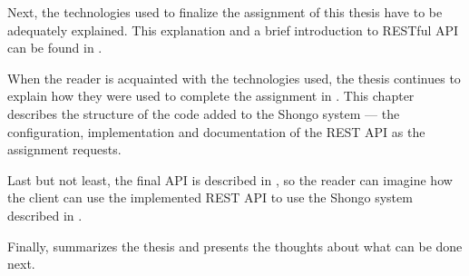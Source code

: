 Next, the technologies used to finalize the assignment of this thesis have to be adequately explained. This explanation and a brief introduction to RESTful API can be found in .

When the reader is acquainted with the technologies used, the thesis continues to explain how they were used to complete the assignment in . This chapter describes the structure of the code added to the Shongo system --- the configuration, implementation and documentation of the REST API as the assignment requests.

Last but not least, the final API is described in , so the reader can imagine how the client can use the implemented REST API to use the Shongo system described in .

Finally,  summarizes the thesis and presents the thoughts about what can be done next.
